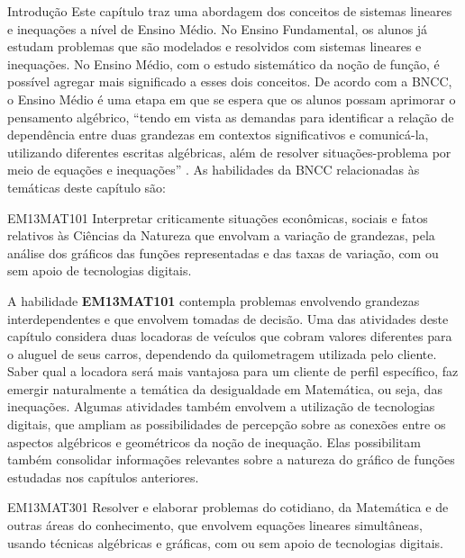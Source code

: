 \begin{apresentacao}{Introdução}
Este capítulo traz uma abordagem dos conceitos de sistemas lineares e inequações a nível de Ensino Médio. No Ensino Fundamental, os alunos já estudam problemas que são modelados e resolvidos com sistemas lineares e inequações. No Ensino Médio, com o estudo sistemático da noção de função, é possível agregar mais significado a esses dois conceitos. De acordo com a BNCC, o Ensino Médio é uma etapa em que se espera que os alunos possam aprimorar o pensamento algébrico, “tendo em vista as demandas para identificar a relação de dependência entre duas grandezas em contextos significativos e comunicá-la, utilizando diferentes escritas algébricas, além de resolver situações-problema por meio de equações e inequações”{} \citep{BNCC2018}. 
As habilidades da BNCC relacionadas às temáticas deste capítulo são:


\begin{habilities}{EM13MAT101}
Interpretar criticamente situações econômicas, sociais e fatos relativos às Ciências da Natureza que envolvam a variação de grandezas, pela análise dos gráficos das funções representadas e das taxas de variação, com ou sem apoio de tecnologias digitais.
\end{habilities}

A habilidade \textbf{EM13MAT101} contempla problemas envolvendo grandezas interdependentes e que envolvem tomadas de decisão. Uma das atividades deste capítulo considera duas locadoras de veículos que cobram valores diferentes para o aluguel de seus carros, dependendo da quilometragem utilizada pelo cliente. Saber qual a locadora será mais vantajosa para um cliente de perfil específico, faz emergir naturalmente a temática da desigualdade em Matemática, ou seja, das inequações. Algumas atividades também envolvem a utilização de tecnologias digitais, que ampliam as possibilidades de percepção sobre as conexões entre os aspectos algébricos e geométricos da noção de inequação. Elas possibilitam também consolidar informações relevantes sobre a natureza do gráfico de funções estudadas nos capítulos anteriores.



\begin{habilities}{EM13MAT301}
Resolver e elaborar problemas do cotidiano, da Matemática e de outras áreas do conhecimento, que envolvem equações lineares simultâneas, usando técnicas algébricas e gráficas, com ou sem apoio de tecnologias digitais.
\end{habilities}


\end{apresentacao}
